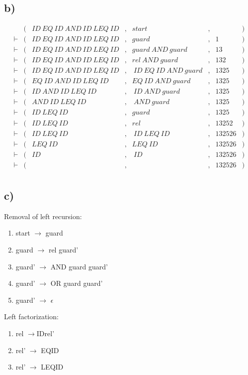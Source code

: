 \subsection*{b)}

\begin{equation*}
  \begin{aligned}
   &(&ID\:EQ\:ID\:AND\:ID\:LEQ\:ID&,& start&,& &) \\
\vdash &(&ID\:EQ\:ID\:AND\:ID\:LEQ\:ID&,& guard&,& 1&) \\
\vdash &(&ID\:EQ\:ID\:AND\:ID\:LEQ\:ID&,& guard\:AND\:guard&,& 13&) \\
\vdash &(&ID\:EQ\:ID\:AND\:ID\:LEQ\:ID&,& rel\:AND\:guard&,& 132&) \\
\vdash &(&ID\:EQ\:ID\:AND\:ID\:LEQ\:ID&,&\:ID\:EQ\:ID\:AND\:guard&,& 1325&) \\
\vdash &(&EQ\:ID\:AND\:ID\:LEQ\:ID&,& EQ\:ID\:AND\:guard&,& 1325&) \\
\vdash &(&ID\:AND\:ID\:LEQ\:ID&,&\:ID\:AND\:guard&,& 1325&) \\
\vdash &(&AND\:ID\:LEQ\:ID&,&\:AND\:guard&,& 1325&) \\
\vdash &(&ID\:LEQ\:ID&,& guard&,& 1325&) \\
\vdash &(&ID\:LEQ\:ID&,& rel&,& 13252&) \\
\vdash &(&ID\:LEQ\:ID&,&\:ID\:LEQ\:ID&,& 132526&) \\
\vdash &(&LEQ\:ID&,& LEQ\:ID&,& 132526&) \\
\vdash &(&ID&,&\:ID&,& 132526&) \\
\vdash &(&&,& &,& 132526&) \\
\end{aligned}
\end{equation*}

\subsection*{c)}
Removal of left recursion:

\begin{enumerate}
\item start $\rightarrow$ guard
\item guard $\rightarrow$ rel guard'
\item guard' $\rightarrow$ AND guard guard'
\item guard' $\rightarrow$ OR guard guard'
\item guard' $\rightarrow$  $\epsilon$
\end{enumerate}

Left factorization:

\begin{enumerate}
\item rel $\rightarrow$\:ID\:rel'
\item rel' $\rightarrow$ EQ\:ID
\item rel' $\rightarrow$ LEQ\:ID
\end{enumerate}